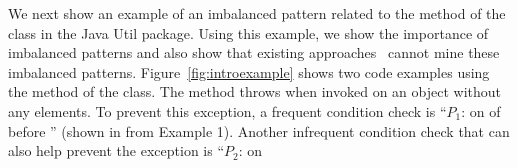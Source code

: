 We next show an example of an imbalanced pattern related to the  method of the  class in the Java Util package. Using this example, we show the importance of imbalanced patterns and also show that existing approaches~\cite{Burdick01mafia, wang:bide} cannot mine these imbalanced patterns.
Figure~\ref{fig:introexample} shows two code examples using the  method of the  class. The  method throws  when invoked on an  object without any elements. To prevent this exception, a frequent condition check is ``$P_1$:  on 
of  before '' (shown in  from Example 1). Another infrequent condition check that can also help prevent the exception is ``$P_2$:  on 
